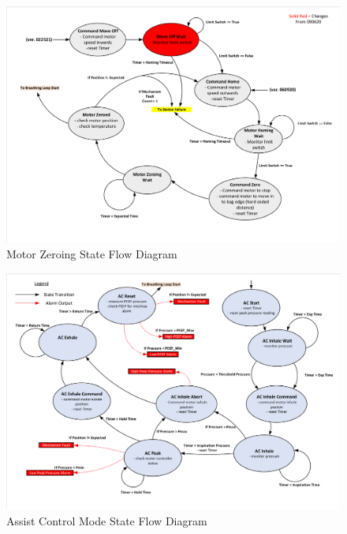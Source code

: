 \documentclass[]{article}
\begin{document}
\begin{appendices}
\begin{figure}
	\includegraphics[scale=0.8, trim = 6 6 6 6, clip]{figures/motor_zeroing.pdf}
	\caption{Motor Zeroing State Flow Diagram}
	\label{fig:mz_stfd}
\end{figure}

\begin{figure}
	\includegraphics[scale=0.8, trim = 6 6 6 6, clip]{figures/ac_mode.pdf}
	\caption{Assist Control Mode State Flow Diagram}
	\label{fig:ac_stfd}
\end{figure}


\end{appendices}
\end{document}
